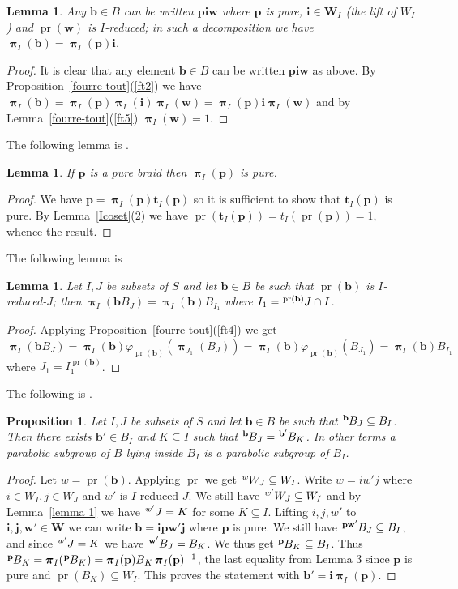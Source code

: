 \documentclass{amsart}
\numberwithin{equation}{section}
\newtheorem{lemma}[equation]{Lemma}
\newtheorem{proposition}[equation]{Proposition}
\newcommand\lexp[2]{\kern\scriptspace\vphantom{#2}^{#1}\kern-\scriptspace#2}
\newcommand\inv{^{-1}}
\newcommand\bb{{\mathbf b}}
\newcommand\bi{{\mathbf i}}
\newcommand\bj{{\mathbf j}}
\newcommand\bp{{\mathbf p}}
\newcommand\bt{{\mathbf t}}
\newcommand\bw{{\mathbf w}}
\newcommand\bW{{\mathbf W}}
\DeclareMathOperator\pr{pr}
\DeclareMathOperator\bpi{\boldsymbol\pi}
\begin{document}
\begin{lemma}\label{piw=1}
Any $\bb\in B$ can be written $\bp\bi\bw$ where $\bp$ is pure,
$\bi\in\bW_I$ (the lift of $W_I$) and $\pr(\bw)$ is $I$-reduced; in such a
decomposition we have $\bpi_I(\bb)=\bpi_I(\bp)\bi$.
\end{lemma}
\begin{proof}
It is clear that any element $\bb\in B$ can be written $\bp\bi\bw$ as above.
 By Proposition~\ref{fourre-tout}(\ref{ft2}) we have $\bpi_I(\bb)=\bpi_I(\bp)\bpi_I(\bi)\bpi_I(\bw)=
 \bpi_I(\bp)\bi\bpi_I(\bw)$  and  by Lemma~\ref{fourre-tout}(\ref{ft5}) $\bpi_I(\bw)=1$.
\end{proof}

The following lemma is \cite[Proposition 2.3(3)]{blufstein-paris}.
\begin{lemma}\label{pi_i(p)}
If $\bp$ is a pure braid then $\bpi_I(\bp)$ is pure.
\end{lemma}
\begin{proof}
We have $\bp=\bpi_I(\bp)\bt_I(\bp)$ so it is sufficient to show that $\bt_I(\bp)$
is pure. By Lemma~\ref{Icoset}(2) we have $\pr(\bt_I(\bp))=t_I(\pr(\bp))=1$,
whence the result.
\end{proof}

The following lemma is \cite[Lemma 3.2]{godelle}
\begin{lemma}\label{lemme 9} Let $I, J$ be subsets of $S$ and let
$\bb\in B$ be such that $\pr(\bb)$ is $I$-reduced-$J$; then $\bpi_I(\bb B_J)=
 \bpi_I(\bb)B_{I_1}$ where $I_1=\lexp {\pr(\bb)} J\cap I$.
\end{lemma}
\begin{proof}
Applying  Proposition~\ref{fourre-tout}(\ref{ft4})
we get $\bpi_I(\bb B_J)=\bpi_I(\bb)\varphi_{\pr(\bb)}(\bpi_{J_1}(B_J))=
\bpi_I(\bb)\varphi_{\pr(\bb)}(B_{J_1})=\bpi_I(\bb)B_{I_1}$ where
$J_1=I_1^{\pr(\bb)}$.
\end{proof}
The following is \cite[Theorem 1.1]{blufstein-paris}.
\begin{proposition}\label{parabolic inside} Let $I,J$ be subsets of $S$ and
let  $\bb\in B$ be such  that $\lexp \bb  B_J\subseteq B_I$. Then there exists
$\bb'\in  B_I$ and $K\subseteq I$ such that $\lexp \bb B_J=\lexp{\bb'}B_K$.
In other terms a parabolic subgroup of $B$ lying inside $B_I$ is a parabolic subgroup of $B_I$.
\end{proposition}
\begin{proof}
Let $w=\pr(\bb)$. Applying $\pr$ we get $\lexp wW_J\subseteq W_I$. Write $w=iw' j$ where $i\in W_I, j\in W_J$ and $w'$ is $I$-reduced-$J$. We still have
$\lexp{w'}W_J\subseteq   W_I$  and  by Lemma~\ref{lemma 1} we  have
$\lexp{w'}J=K$  for some $K\subseteq I$. Lifting $i,j,w'$ to $\bi,\bj,\bw'\in
\bW$  we can write  $\bb=\bi\bp\bw'\bj$ where $\bp$  is pure. We still have
$\lexp{\bp\bw'}B_J\subseteq   B_I$,   and   since   $\lexp{w'}J=K$   we  have
$\lexp{\bw'}B_J=B_K$. We thus get $\lexp\bp B_K\subseteq B_I$. Thus $\lexp\bp
B_K=\bpi_I(\lexp\bp  B_K)=\bpi_I(\bp)B_K\bpi_I(\bp)\inv$,
the last equality from Lemma 3 since $\bp$ is pure and
$\pr(B_K)\subseteq W_I$.
This  proves the statement with $\bb'=\bi\bpi_I(\bp)$.
\end{proof}
\end{document}

